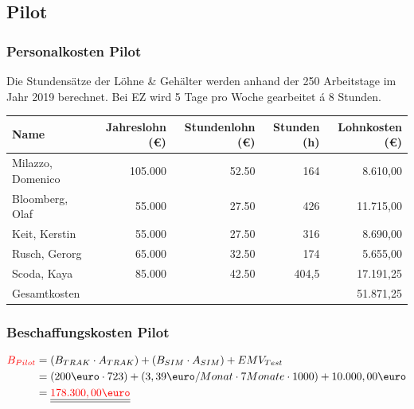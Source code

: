 \documentclass[a4paper,10pt]{scrartcl}
\begin{document}
\subsection{Pilot}
\subsubsection{Personalkosten Pilot}
Die Stundensätze der Löhne \& Gehälter werden anhand der 250 Arbeitstage im Jahr 2019 berechnet. Bei EZ wird 5 Tage pro Woche gearbeitet á 8 Stunden.
\hfill \vspace{5mm}
\begin{tabular}{lrrrr} 
\toprule
\textbf{Name} & \textbf{Jahreslohn (\euro{})} & \textbf{Stundenlohn (\euro{})} & \textbf{Stunden (h)} & \textbf{Lohnkosten (\euro{})}\\ 
\midrule 
Milazzo, Domenico  & 105.000 & 52.50 & 164 & 8.610,00\\
Bloomberg, Olaf  & 55.000 & 27.50 & 426 & 11.715,00\\
Keit, Kerstin  & 55.000 & 27.50 & 316 & 8.690,00\\
Rusch, Gerorg & 65.000 & 32.50 & 174 & 5.655,00\\
Scoda, Kaya & 85.000 & 42.50 & 404,5 & 17.191,25\\
\midrule 
\midrule 
Gesamtkosten &  &  &  & 51.871,25\\ 
\bottomrule
\end{tabular}

\subsubsection{Beschaffungskosten Pilot}
\begin{equation}
\begin{split}
\textcolor{red}{B_{Pilot}} &= (B_{TRAK} \cdot A_{TRAK}) + (B_{SIM} \cdot A_{SIM}) + EMV_{Test}\\\
&= (200 \text{\euro} \cdot 723) + (3,39 \text{\euro}/Monat \cdot 7Monate \cdot 1000) + 10.000,00 \text{\euro} \\\
&= \underline{\underline{\textcolor{red}{178.300,00\text{\euro}}}}
\end{split}
\end{equation}
\end{document}
